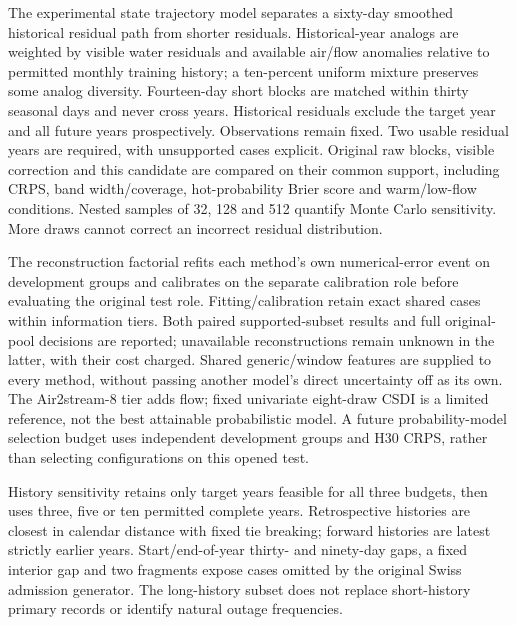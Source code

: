 \documentclass[draft]{agujournal2025}
\begin{document}
The experimental state trajectory model separates a sixty-day smoothed historical residual path from shorter residuals. Historical-year analogs are weighted by visible water residuals and available air/flow anomalies relative to permitted monthly training history; a ten-percent uniform mixture preserves some analog diversity. Fourteen-day short blocks are matched within thirty seasonal days and never cross years. Historical residuals exclude the target year and all future years prospectively. Observations remain fixed. Two usable residual years are required, with unsupported cases explicit. Original raw blocks, visible correction and this candidate are compared on their common support, including CRPS, band width/coverage, hot-probability Brier score and warm/low-flow conditions. Nested samples of 32, 128 and 512 quantify Monte Carlo sensitivity. More draws cannot correct an incorrect residual distribution.

The reconstruction factorial refits each method's own numerical-error event on development groups and calibrates on the separate calibration role before evaluating the original test role. Fitting/calibration retain exact shared cases within information tiers. Both paired supported-subset results and full original-pool decisions are reported; unavailable reconstructions remain unknown in the latter, with their cost charged. Shared generic/window features are supplied to every method, without passing another model's direct uncertainty off as its own. The Air2stream-8 tier adds flow; fixed univariate eight-draw CSDI is a limited reference, not the best attainable probabilistic model. A future probability-model selection budget uses independent development groups and H30 CRPS, rather than selecting configurations on this opened test.

History sensitivity retains only target years feasible for all three budgets, then uses three, five or ten permitted complete years. Retrospective histories are closest in calendar distance with fixed tie breaking; forward histories are latest strictly earlier years. Start/end-of-year thirty- and ninety-day gaps, a fixed interior gap and two fragments expose cases omitted by the original Swiss admission generator. The long-history subset does not replace short-history primary records or identify natural outage frequencies.
\end{document}
